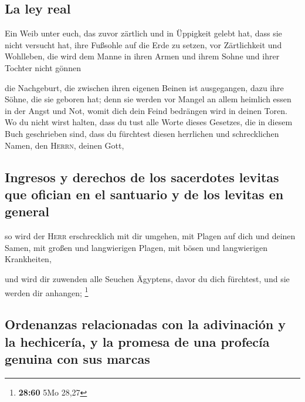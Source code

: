\hypertarget{la-ley-real}{%
\subsection{La ley real}\label{la-ley-real}}

 Ein Weib unter euch, das zuvor zärtlich und in Üppigkeit
gelebt hat, dass sie nicht versucht hat, ihre Fußsohle auf die Erde zu
setzen, vor Zärtlichkeit und Wohlleben, die wird dem Manne in ihren
Armen und ihrem Sohne und ihrer Tochter nicht gönnen

 die Nachgeburt, die zwischen ihren eigenen Beinen ist
ausgegangen, dazu ihre Söhne, die sie geboren hat; denn sie werden vor
Mangel an allem heimlich essen in der Angst und Not, womit dich dein
Feind bedrängen wird in deinen Toren.  Wo du nicht wirst
halten, dass du tust alle Worte dieses Gesetzes, die in diesem Buch
geschrieben sind, dass du fürchtest diesen herrlichen und schrecklichen
Namen, den \textsc{Herrn}, deinen Gott,

\hypertarget{ingresos-y-derechos-de-los-sacerdotes-levitas-que-ofician-en-el-santuario-y-de-los-levitas-en-general}{%
\subsection{Ingresos y derechos de los sacerdotes levitas que ofician en
el santuario y de los levitas en
general}\label{ingresos-y-derechos-de-los-sacerdotes-levitas-que-ofician-en-el-santuario-y-de-los-levitas-en-general}}

 so wird der \textsc{Herr} erschrecklich mit dir umgehen,
mit Plagen auf dich und deinen Samen, mit großen und langwierigen
Plagen, mit bösen und langwierigen Krankheiten,

 und wird dir zuwenden alle Seuchen Ägyptens, davor du
dich fürchtest, und sie werden dir anhangen; \footnote{\textbf{28:60}
  5Mo 28,27}

\hypertarget{ordenanzas-relacionadas-con-la-adivinaciuxf3n-y-la-hechiceruxeda-y-la-promesa-de-una-profecuxeda-genuina-con-sus-marcas}{%
\subsection{Ordenanzas relacionadas con la adivinación y la hechicería,
y la promesa de una profecía genuina con sus
marcas}\label{ordenanzas-relacionadas-con-la-adivinaciuxf3n-y-la-hechiceruxeda-y-la-promesa-de-una-profecuxeda-genuina-con-sus-marcas}}

